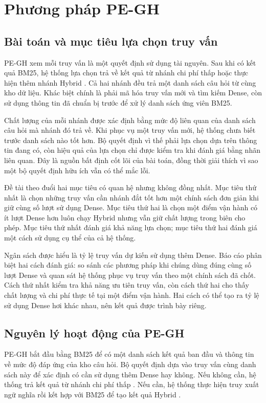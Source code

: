 \chapter{Phương pháp PE-GH}
\label{chap:method}

\section{Bài toán và mục tiêu lựa chọn truy vấn}
PE-GH xem mỗi truy vấn là một quyết định sử dụng tài nguyên. Sau khi có kết quả BM25, hệ thống lựa chọn trả về kết quả từ nhánh chi phí thấp \Pstar{} hoặc thực hiện thêm nhánh Hybrid \Hstar{}. Cả hai nhánh đều trả một danh sách câu hỏi từ cùng kho dữ liệu. Khác biệt chính là \Hstar{} phải mã hóa truy vấn mới và tìm kiếm Dense, còn \Pstar{} sử dụng thông tin đã chuẩn bị trước để xử lý danh sách ứng viên BM25.

Chất lượng của mỗi nhánh được xác định bằng mức độ liên quan của danh sách câu hỏi mà nhánh đó trả về. Khi phục vụ một truy vấn mới, hệ thống chưa biết trước danh sách nào tốt hơn. Bộ quyết định vì thế phải lựa chọn dựa trên thông tin đang có, còn hiệu quả của lựa chọn chỉ được kiểm tra khi đánh giá bằng nhãn liên quan. Đây là nguồn bất định cốt lõi của bài toán, đồng thời giải thích vì sao một bộ quyết định hữu ích vẫn có thể mắc lỗi.

Đề tài theo đuổi hai mục tiêu có quan hệ nhưng không đồng nhất. Mục tiêu thứ nhất là chọn những truy vấn cần nhánh đắt tốt hơn một chính sách đơn giản khi giữ cùng số lượt sử dụng Dense. Mục tiêu thứ hai là chọn một điểm vận hành có ít lượt Dense hơn luôn chạy Hybrid nhưng vẫn giữ chất lượng trong biên cho phép. Mục tiêu thứ nhất đánh giá khả năng lựa chọn; mục tiêu thứ hai đánh giá một cách sử dụng cụ thể của cả hệ thống.

Ngân sách được hiểu là tỷ lệ truy vấn dự kiến sử dụng thêm Dense. Báo cáo phân biệt hai cách đánh giá: so sánh các phương pháp khi chúng dùng đúng cùng số lượt Dense và quan sát hệ thống phục vụ truy vấn theo một chính sách đã chốt. Cách thứ nhất kiểm tra khả năng ưu tiên truy vấn, còn cách thứ hai cho thấy chất lượng và chi phí thực tế tại một điểm vận hành. Hai cách có thể tạo ra tỷ lệ sử dụng Dense hơi khác nhau, nên kết quả được trình bày riêng.

\section{Nguyên lý hoạt động của PE-GH}
PE-GH bắt đầu bằng BM25 để có một danh sách kết quả ban đầu và thông tin về mức độ đáp ứng của kho câu hỏi. Bộ quyết định dựa vào truy vấn cùng danh sách này để xác định có cần sử dụng thêm Dense hay không. Nếu không cần, hệ thống trả kết quả từ nhánh chi phí thấp \Pstar{}. Nếu cần, hệ thống thực hiện truy xuất ngữ nghĩa rồi kết hợp với BM25 để tạo kết quả Hybrid \Hstar{}.

